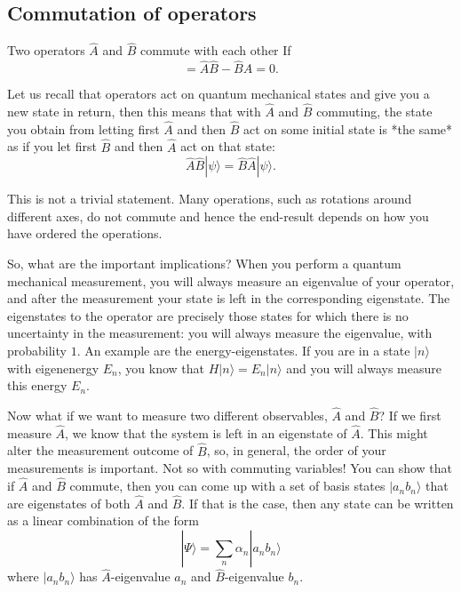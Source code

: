 \subsection{Commutation of operators}

\begin{defn}
    Two operators $\hat A$ and $\hat B$ commute with each other If
    \begin{equation}
        [\hat A,\hat B] = \hat A \hat B - \hat B \hat A = 0.
    \end{equation}
\end{defn}


Let us recall that operators act on quantum mechanical states and give you a new state in return, then this means that with $\hat A$ and $\hat B$ commuting, the state you obtain from letting first $\hat A$ and then $\hat B$ act on some initial state is *the same* as if you let first $\hat B$ and then $\hat A$ act on that state:
$$\hat A \hat B | \psi \rangle = \hat B \hat A | \psi \rangle.$$

This is not a trivial statement. Many operations, such as rotations around different axes, do not commute and hence the end-result depends on how you have ordered the operations.

So, what are the important implications? When you perform a quantum mechanical measurement, you will always measure an eigenvalue of your operator, and after the measurement your state is left in the corresponding eigenstate. The eigenstates to the operator are precisely those states for which there is no uncertainty in the measurement: you will always measure the eigenvalue, with probability $1$.
An example are the energy-eigenstates. If you are in a state $|n\rangle$ with eigenenergy $E_n$, you know that $H|n\rangle = E_n |n \rangle$ and you will always measure this energy $E_n$.

Now what if we want to measure two different observables, $\hat A$ and $\hat B$? If we first measure $\hat A$, we know that the system is left in an eigenstate of $\hat A$. This might alter the measurement outcome of $\hat B$, so, in general, the order of your measurements is important. Not so with commuting variables! You can show that if $\hat A$ and $\hat B$ commute, then you can come up with a set of basis states $| a_n b_n\rangle$ that are eigenstates of both $\hat A$ and $\hat B$. If that is the case, then any state can be written as a linear combination of the form
$$| \Psi \rangle = \sum_n \alpha_n | a_n b_n \rangle$$
where $|a_n b_n\rangle$ has $\hat A$-eigenvalue $a_n$ and $\hat B$-eigenvalue $b_n$.

